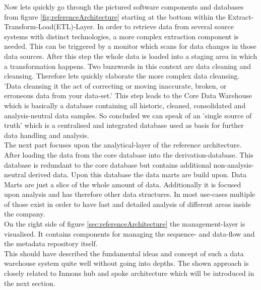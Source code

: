 Now lets quickly go through the pictured software components and databases from figure \ref{fig:referenceArchitecture} starting at the bottom within the Extract-Transform-Load(ETL)-Layer. In order to retrieve data from several source systems with distinct technologies, a more complex extraction component is needed. This can be triggered by a monitor which scans for data changes in those data sources.\newline
After this step the whole data is loaded into a staging area in which a transformation happens. Two buzzwords in this context are data cleaning and cleansing. Therefore lets quickly elaborate the more complex data cleansing. 
'Data cleansing it the act of correcting or moving inaccurate, broken, or erroneous data from your data-set.'\cite{dataCleansing}
This step leads to the Core Data Warehouse which is basically a database containing all historic, cleaned, consolidated and analysis-neutral data samples. So concluded we can speak of an 'single source of truth'\cite{scriptRasch} which is a centralised and integrated database used as basis for further data handling and analysis.\newline
\\
The next part focuses upon the analytical-layer of the reference architecture. After loading the data from the core database into the derivation-database. This database is redundant to the core database but contains additional non-analysis-neutral derived data. Upon this database the data marts are build upon. Data Marts are just a slice of the whole amount of data. Additionally it is focused upon analysis and has therefore other data structures. In most use-cases multiple of those exist in order to have fast and detailed analysis of different areas inside the company.\newline
\\
On the right side of figure \ref{sec:referenceArchitecture} the management-layer is visualised. It contains components for managing the sequence- and data-flow and the metadata repository itself.\newline
\\
This should have described the fundamental ideas and concept of such a data warehouse system quite well without going into depths. The shown approach is closely related to Inmons hub and spoke architecture which will be introduced in the next section. 
